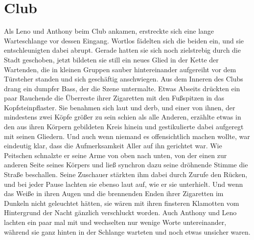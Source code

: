 \documentclass[ngerman,smalldemyvopaper,11pt,oneside,onecolumn,openright,extrafontsizes]{memoir}
\begin{document}
\chapter{Club}
Als Leno und Anthony beim Club ankamen, erstreckte sich eine lange Warteschlange vor dessen Eingang. Wortlos fädelten sich die beiden ein, und sie entschleunigten dabei abrupt. Gerade hatten sie sich noch zielstrebig durch die Stadt geschoben, jetzt bildeten sie still ein neues Glied in der Kette der Wartenden, die in kleinen Gruppen sauber hintereinander aufgereiht vor dem Türsteher standen und sich geschäftig anschwiegen. Aus dem Inneren des Clubs drang ein dumpfer Bass, der die Szene untermalte. Etwas Abseits drückten ein paar Rauchende die Überreste ihrer Zigaretten mit den Fußspitzen in das Kopfsteinpflaster. Sie benahmen sich laut und derb, und einer von ihnen, der mindestens zwei Köpfe größer zu sein schien als alle Anderen, erzählte etwas in den aus ihren Körpern gebildeten Kreis hinein und gestikulierte dabei aufgeregt mit seinen Gliedern. Und auch wenn niemand es offensichtlich machen wollte, war eindeutig klar, dass die Aufmerksamkeit Aller auf ihn gerichtet war. Wie Peitschen schnalzte er seine Arme von oben nach unten, von der einen zur anderen Seite seines Körpers und ließ synchron dazu seine dröhnende Stimme die Straße beschallen. Seine Zuschauer stärkten ihm dabei durch Zurufe den Rücken, und bei jeder Pause lachten sie ebenso laut auf, wie er sie unterhielt. Und wenn das Weiße in ihren Augen und die brennenden Enden ihrer Zigaretten im Dunkeln nicht geleuchtet hätten, sie wären mit ihren finsteren Klamotten vom Hintergrund der Nacht gänzlich verschluckt worden. Auch Anthony und Leno lachten ein paar mal mit und wechselten nur wenige Worte untereinander, während sie ganz hinten in der Schlange warteten und noch etwas unsicher waren.
\vspace{0.5em} \\
\end{document}
